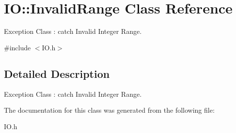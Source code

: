 \hypertarget{classIO_1_1InvalidRange}{}\section{IO\+:\+:Invalid\+Range Class Reference}
\label{classIO_1_1InvalidRange}


Exception Class \+: catch Invalid Integer Range.  




{\ttfamily \#include $<$I\+O.\+h$>$}



\subsection{Detailed Description}
Exception Class \+: catch Invalid Integer Range. 

The documentation for this class was generated from the following file\+:\begin{DoxyCompactItemize}
\item 
I\+O.\+h\end{DoxyCompactItemize}
